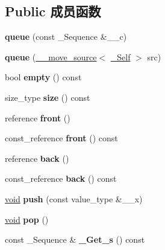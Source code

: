 \subsection*{Public 成员函数}
\begin{DoxyCompactItemize}
\item 
\mbox{\label{classqueue_a66cee56dfa5f8321d05ea64c11b7dfb5}} 
{\bfseries queue} (const \+\_\+\+Sequence \&\+\_\+\+\_\+c)
\item 
\mbox{\label{classqueue_a5fcbe98ef0ae05cceba8b365d02a0dcf}} 
{\bfseries queue} (\hyperlink{class____move__source}{\+\_\+\+\_\+move\+\_\+source}$<$ \hyperlink{classqueue}{\+\_\+\+Self} $>$ src)
\item 
\mbox{\label{classqueue_acf0a27987aed1effd3a4bda1dca7f99f}} 
bool {\bfseries empty} () const
\item 
\mbox{\label{classqueue_a6efc33c7ea09cfdcb189c815293f6479}} 
size\+\_\+type {\bfseries size} () const
\item 
\mbox{\label{classqueue_a314d0cce94c749a52c642c70ad2fd675}} 
reference {\bfseries front} ()
\item 
\mbox{\label{classqueue_ad1d1bd56e8fa43d99de206e0839b50c5}} 
const\+\_\+reference {\bfseries front} () const
\item 
\mbox{\label{classqueue_a114e924b541c35e1a1efd1d84eba79e5}} 
reference {\bfseries back} ()
\item 
\mbox{\label{classqueue_ae377847f37983d4549ba6b667703bf51}} 
const\+\_\+reference {\bfseries back} () const
\item 
\mbox{\label{classqueue_a658ab613eecb83bdb02768c6b4c02067}} 
\hyperlink{interfacevoid}{void} {\bfseries push} (const value\+\_\+type \&\+\_\+\+\_\+x)
\item 
\mbox{\label{classqueue_a9910533a8c51620375ff7567d79d8f30}} 
\hyperlink{interfacevoid}{void} {\bfseries pop} ()
\item 
\mbox{\label{classqueue_a166da26ffcc38ae6a2af42bf2f3f4d3b}} 
const \+\_\+\+Sequence \& {\bfseries \+\_\+\+Get\+\_\+s} () const
\end{DoxyCompactItemize}
